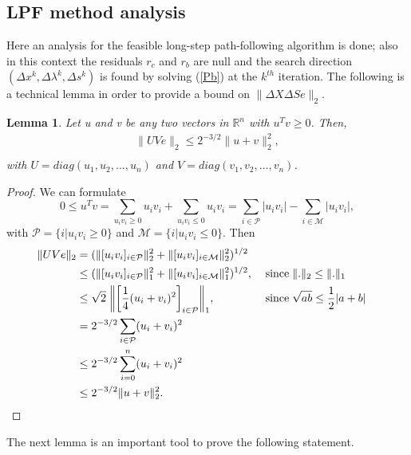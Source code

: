 \documentclass[a4paper,10 pt,titlepage,twoside]{book}
\theoremstyle{plain}
\newtheorem{lem}[thm]{Lemma}
\theoremstyle{definition}
\theoremstyle{remark}
\begin{document}
\subsection{LPF method analysis}
Here an analysis for the feasible long-step path-following algorithm is done; also in this context the residuals $r_{c}$ and $r_{b}$ are null and the search direction $(\Delta x^{k}, \Delta \lambda^{k}, \Delta s^{k})$ is found by solving (\ref{Pb}) at the $k^{th}$ iteration.
The following is a technical lemma in order to provide a bound on $\lVert\Delta X\Delta S e\rVert_{2}$.
\begin{lem}\label{lem1}
	Let u and v be any two vectors in $\mathbb{R}^{n}$ with $u^{T}v \geq 0$. Then, 
	\begin{align*}
	\lVert UVe \rVert_{2}\leq 2^{-3/2}\lVert u + v \rVert^{2}_{2},\\
	\end{align*}
	with $U = diag(u_{1}, u_{2}, ..., u_{n})$ and $V = diag(v_{1}, v_{2}, ..., v_{n})$. 
\end{lem}
\begin{proof}
	We can formulate
	\begin{equation*} 
	0 \leq u^{T}v = \sum\limits_{u_{i}v_{i} \geq 0}u_{i}v_{i} + \sum\limits_{u_{i}v_{i} \leq 0}u_{i}v_{i} = \sum\limits_{i \in \mathcal{P}}|u_{i}v_{i}| - \sum\limits_{i \in \mathcal{M}}|u_{i}v_{i}|, \end{equation*} with $\mathcal{P}= \{i | u_{i}v_{i} \geq 0\}$ and $\mathcal{M}= \{i | u_{i}v_{i} \leq 0\}$.
	Then
	\begin{align*}
	\lVert UVe \rVert_{2} &= ( \lVert[u_{i}v_{i}]_{i \in \mathcal{P}} \rVert^{2}_{2} +  \lVert[u_{i}v_{i}]_{i \in \mathcal{M}} \rVert^{2}_{2})^{1/2}\\
	&\leq ( \lVert[u_{i}v_{i}]_{i \in \mathcal{P}} \rVert^{2}_{1} +  \lVert[u_{i}v_{i}]_{i \in \mathcal{M}} \rVert^{2}_{1})^{1/2},\; &&\text{since\;} \lVert.\rVert_{2} \leq \lVert.\rVert_{1}\\
	&\leq\sqrt{2}\;\bigg\lVert\bigg[\frac{1}{4}(u_{i} + v_{i})^{2}\bigg]_{i\in \mathcal{P}}\bigg\rVert_{1}, &&\text{since\;} \sqrt{ab} \leq \frac{1}{2}|a+b|\\
	& = 2^{-3/2} \sum\limits_{i \in \mathcal{P}}(u_{i} + v_{i})^{2}\\
	& \leq 2^{-3/2} \sum\limits_{i = 0}^{n}(u_{i} + v_{i})^{2}\\
	& \leq 2^{-3/2} \lVert u + v \rVert^{2}_{2}.
	\end{align*}
\end{proof}	
The next lemma is an important tool to prove the following statement.
\end{document}

